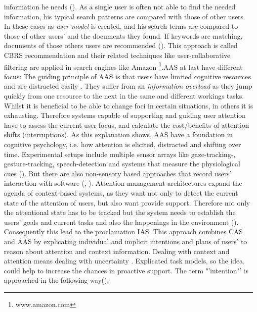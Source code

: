 information he needs (\cite{budzik2000user}).  As a single user is often not able to find the needed information, his typical search patterns are compared with those of other users. In these cases as \textit{user model} is created, and his search terms are compared to those of other users' and the documents they found. If keywords are matching, documents of those others users are recommended (\cite{anand2007contextual}). This approach is called \ac{CBRS} recommendation and their related techniques like user-collaborative filtering are applied in search engines like Amazon \footnote{www.amazon.com}.\ac{AAS} at last have different focus: The guiding principle of \acs{AAS} is that users have limited cognitive resources and are distracted easily . They suffer from an \textit{information overload} as they jump quickly from one resource to the next in the same and different workings tasks. Whilst it is beneficial to be able to change foci in certain situations, in others it is exhausting. Therefore systems capable of supporting and guiding user attention have to assess the current user focus, and calculate the cost/benefits of attention shifts (interruptions). As this explanation shows, \acs{AAS} have a foundation in cognitive psychology, i.e. how attention is elicited, distracted and shifting over time. Experimental setups include multiple sensor arrays like  gaze-tracking-, gesture-tracking, speech-detection and systems that measure the physiological cues (\cite{roda2006attention}). But there are also non-sensory based approaches that record users' interaction with software (\cite{horvitz2003models}, \cite{schmitz2011contextualized}). Attention management architectures expand the agenda of context-based systems, as they want not only to detect the current state of the attention of users, but also want provide support. Therefore not only the attentional state has to be tracked but the system needs to establish the users' goals and current tasks and also the happenings in the environment (\cite{roda2006attention}). Consequently this lead to the proclamation \ac{IAS}. This approach combines \acs{CAS} and \acs{AAS} by explicating individual and implicit intentions and plans of users' to reason about attention and context information. Dealing with context and attention means dealing with uncertainty . Explicated task models, so the idea, could help to increase the chances in proactive support. The term "'intention"' is  approached in the following way(\cite{cohen1990intention}):
